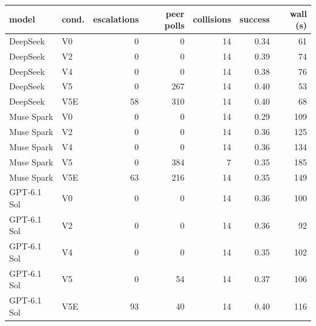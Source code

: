 \begin{tabular}{llrrrrr}
\toprule
model & cond. & escalations & peer polls & collisions & success & wall (s) \\
\midrule
DeepSeek & V0 & 0 & 0 & 14 & 0.34 & 61 \\
DeepSeek & V2 & 0 & 0 & 14 & 0.39 & 74 \\
DeepSeek & V4 & 0 & 0 & 14 & 0.38 & 76 \\
DeepSeek & V5 & 0 & 267 & 14 & 0.40 & 53 \\
DeepSeek & V5E & 58 & 310 & 14 & 0.40 & 68 \\
Muse Spark & V0 & 0 & 0 & 14 & 0.29 & 109 \\
Muse Spark & V2 & 0 & 0 & 14 & 0.36 & 125 \\
Muse Spark & V4 & 0 & 0 & 14 & 0.36 & 134 \\
Muse Spark & V5 & 0 & 384 & 7 & 0.35 & 185 \\
Muse Spark & V5E & 63 & 216 & 14 & 0.35 & 149 \\
GPT-6.1 Sol & V0 & 0 & 0 & 14 & 0.36 & 100 \\
GPT-6.1 Sol & V2 & 0 & 0 & 14 & 0.36 & 92 \\
GPT-6.1 Sol & V4 & 0 & 0 & 14 & 0.35 & 102 \\
GPT-6.1 Sol & V5 & 0 & 54 & 14 & 0.37 & 106 \\
GPT-6.1 Sol & V5E & 93 & 40 & 14 & 0.40 & 116 \\
\bottomrule
\end{tabular}
